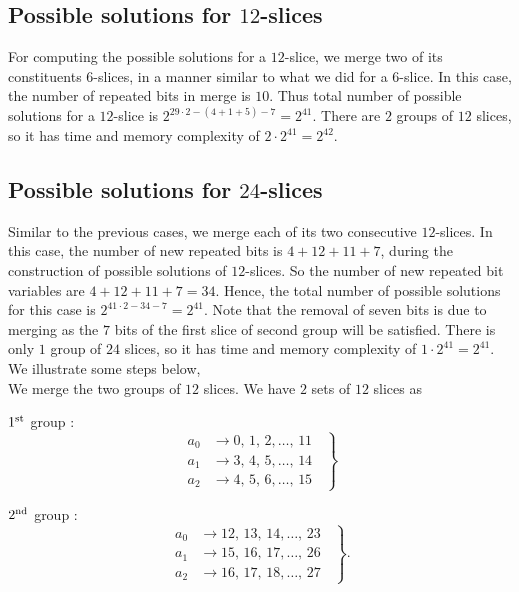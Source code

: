\subsection{Possible solutions for $12$-slices} 
For computing the possible solutions for a $12$-slice, we merge two of its constituents $6$-slices, in a manner similar to what we did for a $6$-slice. In this case, the number of repeated bits in merge is $10$. Thus total number of possible solutions for a $12$-slice is $2^{29 \cdot 2 - (4 + 1 + 5) - 7} = 2^{41}$. There are $2$ groups of $12$ slices, so it has time and memory complexity of $2 \cdot 2^{41} = 2^{42}$.

\subsection{Possible solutions for $24$-slices}  
Similar to the previous cases, we merge each of its two consecutive $12$-slices. 
In this case, the number of new repeated bits is $4 + 12 + 11 + 7$, during the construction of possible solutions of $12$-slices. So the number of new repeated bit variables are $4 + 12 + 11 + 7 = 34$.
Hence, the total number of possible solutions for this case is $2^{41\cdot 2 - 34 - 7} = 2^{41}$. Note that the removal of seven bits is due to merging as the $7$ bits of the first slice of second group will be satisfied. There is only $1$ group of $24$ slices, so it has time and memory complexity of $1 \cdot 2^{41} = 2^{41}$. We illustrate some steps below, \\

We merge the two groups of $12$ slices.
We have $2$ sets of $12$ slices as

$1^{\rm st}$ group :
\begin{equation}\label{48_sol_1}
	\left.
	\begin{aligned}
    	a_0 &\rightarrow 0,\, 1,\, 2, \ldots ,\, 11\\
    	a_1 &\rightarrow 3,\,4, \,5, \ldots ,\, 14\\
    	a_2 &\rightarrow 4,\,5,\,6, \ldots ,\, 15
    \end{aligned}
    \;\;\right\}
\end{equation}

$2^{\rm nd}$ group :
\begin{equation}\label{48_sol_2}
	\left.
	\begin{aligned}    
      a_0 & \rightarrow 12,\, 13,\, 14, \ldots , \,23\\
      a_1 & \rightarrow 15,\, 16, \,17, \ldots , \,26\\
      a_2 & \rightarrow 16,\, 17,\,18, \ldots , \,27
    \end{aligned}
	\;\;\right\}.
\end{equation}

